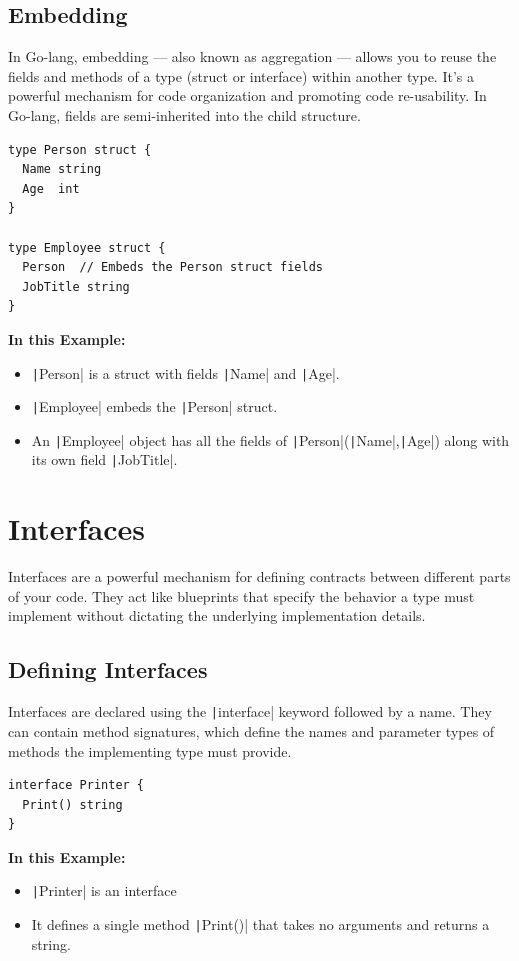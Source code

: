 \documentclass[letterpaper,12pt]{article}
\begin{document}
\subsection{Embedding}
In Go-lang, embedding — also known as aggregation — allows you to reuse the fields and methods of a type (struct or interface) within another type. It's a powerful mechanism for code organization and promoting code re-usability. In Go-lang, fields are semi-inherited into the child structure.
\begin{verbatim}
type Person struct {
  Name string
  Age  int
}

type Employee struct {
  Person  // Embeds the Person struct fields
  JobTitle string
}
\end{verbatim}
\newpage
\noindent
\textbf{In this Example:}
\begin{itemize}
  \item \texttt|Person| is a struct with fields \texttt|Name| and \texttt|Age|.
  \item \texttt|Employee| embeds the \texttt|Person| struct.
  \item An \texttt|Employee| object has all the fields of \texttt|Person|(\texttt|Name|,\texttt|Age|) along with its own field \texttt|JobTitle|.
\end{itemize}
\section{Interfaces}
Interfaces are a powerful mechanism for defining contracts between different parts of your code. They act like blueprints that specify the behavior a type must implement without dictating the underlying implementation details.
\subsection{Defining Interfaces}
Interfaces are declared using the \texttt|interface| keyword followed by a name. They can contain method signatures, which define the names and parameter types of methods the implementing type must provide.
\begin{verbatim}
interface Printer {
  Print() string
}
\end{verbatim}
\textbf{In this Example:}
\begin{itemize}
  \item \texttt|Printer| is an interface
  \item It defines a single method \texttt|Print()| that takes no arguments and returns a string.
\end{itemize}
\end{document}
